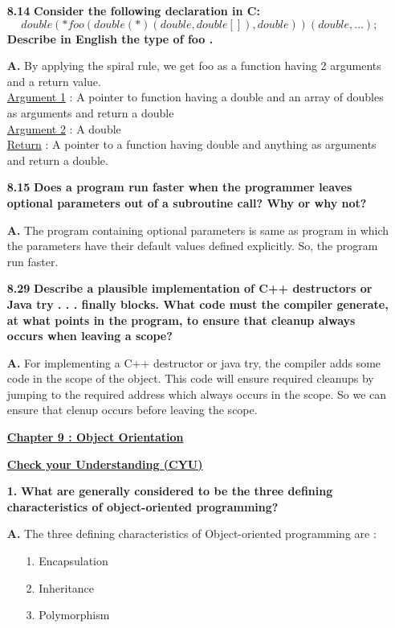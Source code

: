\documentclass[letterpaper]{article}
\begin{document}
\begin{large}
\begin{flushleft}
\begin{enumerate}
\item[\textbf{8.14}]
\textbf{Consider the following declaration in C:
$$double(*foo(double (*)(double, double[]), double)) (double, ...);$$
Describe in English the type of foo .}
\item[\textbf{A.}]
By applying the spiral rule, we get foo as a function having 2 arguments and a return value.\\
\underline{Argument 1} : A pointer to function having a double and an array of doubles as arguments and return a double\\
\underline{Argument 2} :  A double \\
\underline{Return} :  A pointer to a function having double and anything as arguments and return a double.

\item[\textbf{8.15}]
\textbf{Does a program run faster when the programmer leaves optional parameters out of a subroutine call? Why or why not?}
\item[\textbf{A.}]
The program containing optional parameters is same as program in which the parameters have their default values defined explicitly. So, the program run faster.

\item[\textbf{8.29}]
\textbf{Describe a plausible implementation of C++ destructors or Java try . . . finally blocks. What code must the compiler generate, at what points
in the program, to ensure that cleanup always occurs when leaving a
scope?}
\item[\textbf{A.}]
For implementing a C++ destructor or java try, the compiler adds some code in the scope of the object. This code will ensure required cleanups by jumping to the required address which always occurs in the scope. So we can ensure that clenup occurs before leaving the scope.

\pagebreak

\begin{center}
\underline{\textbf{Chapter 9 : Object Orientation }}\\[0.2in] 
\end{center}
\textbf{\underline{Check your Understanding (CYU) }}\\[0.2in]

\item[\textbf{1.}]
\textbf{What are generally considered to be the three defining characteristics of object-oriented programming?}
\item[\textbf{A.}]
The three defining characteristics of Object-oriented programming are : 
\begin{enumerate}
\item[1.] Encapsulation
\item[2.] Inheritance
\item[3.] Polymorphism
\end{enumerate}


\end{enumerate}
\end{flushleft}
\end{large}
\end{document}
